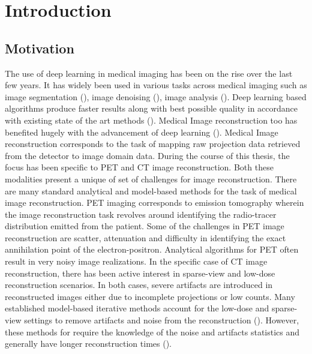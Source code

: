 
\chapter{Introduction} %

\label{Chapter1} %


\section{Motivation}

The use of deep learning in medical imaging has been on the rise over the last few years. It has widely been used in various tasks across medical imaging such as image segmentation  (\cite{ronneberger2015u,guo2019deep,sinha2019multi,dolz2018hyperdense,hatt2018first}), image denoising (\cite{kadimesetty2018convolutional,li2020sacnn,chen2017low,yang2018low}), image analysis (\cite{litjens2017survey,amyar20193,cui2018artificial}). %
Deep learning based algorithms produce faster results along with best possible quality in accordance with existing state of the art methods (\cite{leuschner2021quantitative}). Medical Image reconstruction too has benefited hugely with the advancement of deep learning (\cite{reader2020deep,zhang2020review}).
Medical Image reconstruction corresponds to the task of mapping raw projection data retrieved from the detector to image domain data. During the course of this thesis, the focus has been specific to \ac{PET} and \ac{CT} image reconstruction. Both these modalities present a unique of set of challenges for image reconstruction. There are many standard analytical and model-based methods for the task of medical image reconstruction. \ac{PET} imaging corresponds to emission tomography wherein the image reconstruction task revolves around identifying the radio-tracer distribution emitted from the patient.    Some of the challenges in \ac{PET} image reconstruction are scatter, attenuation and difficulty in identifying the exact annihilation point of the electron-positron. Analytical algorithms for \ac{PET} often result in very noisy image realizations. In the specific case of \ac{CT} image reconstruction, there has been active interest in sparse-view and low-dose reconstruction scenarios. In both cases, severe artifacts are introduced in  reconstructed images either due to incomplete projections or low counts. Many established model-based iterative methods account for the low-dose and sparse-view settings to remove artifacts and noise from the reconstruction (\cite{nuyts1998iterative,Elbakri2002,liu2013total}). However, these methods for require the knowledge of the noise and artifacts statistics and generally have longer reconstruction times (\cite{kim2014combining}). 









